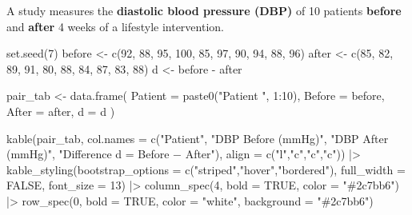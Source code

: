 \documentclass[
  12pt,
  letterpaper,
]{book}
\newenvironment{Shaded}{\begin{snugshade}}{\end{snugshade}}
\newcommand{\AttributeTok}[1]{\textcolor[rgb]{0.40,0.45,0.13}{#1}}
\newcommand{\ConstantTok}[1]{\textcolor[rgb]{0.56,0.35,0.01}{#1}}
\newcommand{\DecValTok}[1]{\textcolor[rgb]{0.68,0.00,0.00}{#1}}
\newcommand{\FunctionTok}[1]{\textcolor[rgb]{0.28,0.35,0.67}{#1}}
\newcommand{\NormalTok}[1]{\textcolor[rgb]{0.00,0.23,0.31}{#1}}
\newcommand{\OtherTok}[1]{\textcolor[rgb]{0.00,0.23,0.31}{#1}}
\newcommand{\SpecialCharTok}[1]{\textcolor[rgb]{0.37,0.37,0.37}{#1}}
\newcommand{\StringTok}[1]{\textcolor[rgb]{0.13,0.47,0.30}{#1}}
\begin{document}
A study measures the \textbf{diastolic blood pressure (DBP)} of 10
patients \textbf{before} and \textbf{after} 4 weeks of a lifestyle
intervention.

\begin{Shaded}
\begin{Highlighting}[]
\FunctionTok{set.seed}\NormalTok{(}\DecValTok{7}\NormalTok{)}
\NormalTok{before }\OtherTok{\textless{}{-}} \FunctionTok{c}\NormalTok{(}\DecValTok{92}\NormalTok{, }\DecValTok{88}\NormalTok{, }\DecValTok{95}\NormalTok{, }\DecValTok{100}\NormalTok{, }\DecValTok{85}\NormalTok{, }\DecValTok{97}\NormalTok{, }\DecValTok{90}\NormalTok{, }\DecValTok{94}\NormalTok{, }\DecValTok{88}\NormalTok{, }\DecValTok{96}\NormalTok{)}
\NormalTok{after  }\OtherTok{\textless{}{-}} \FunctionTok{c}\NormalTok{(}\DecValTok{85}\NormalTok{, }\DecValTok{82}\NormalTok{, }\DecValTok{89}\NormalTok{, }\DecValTok{91}\NormalTok{,  }\DecValTok{80}\NormalTok{, }\DecValTok{88}\NormalTok{, }\DecValTok{84}\NormalTok{, }\DecValTok{87}\NormalTok{, }\DecValTok{83}\NormalTok{, }\DecValTok{88}\NormalTok{)}
\NormalTok{d      }\OtherTok{\textless{}{-}}\NormalTok{ before }\SpecialCharTok{{-}}\NormalTok{ after}

\NormalTok{pair\_tab }\OtherTok{\textless{}{-}} \FunctionTok{data.frame}\NormalTok{(}
  \AttributeTok{Patient =} \FunctionTok{paste0}\NormalTok{(}\StringTok{"Patient "}\NormalTok{, }\DecValTok{1}\SpecialCharTok{:}\DecValTok{10}\NormalTok{),}
  \AttributeTok{Before  =}\NormalTok{ before,}
  \AttributeTok{After   =}\NormalTok{ after,}
  \AttributeTok{d       =}\NormalTok{ d}
\NormalTok{)}

\FunctionTok{kable}\NormalTok{(pair\_tab,}
      \AttributeTok{col.names =} \FunctionTok{c}\NormalTok{(}\StringTok{"Patient"}\NormalTok{, }\StringTok{"DBP Before (mmHg)"}\NormalTok{,}
                    \StringTok{"DBP After (mmHg)"}\NormalTok{, }\StringTok{"Difference d = Before − After"}\NormalTok{),}
      \AttributeTok{align =} \FunctionTok{c}\NormalTok{(}\StringTok{"l"}\NormalTok{,}\StringTok{"c"}\NormalTok{,}\StringTok{"c"}\NormalTok{,}\StringTok{"c"}\NormalTok{)) }\SpecialCharTok{|\textgreater{}}
  \FunctionTok{kable\_styling}\NormalTok{(}\AttributeTok{bootstrap\_options =} \FunctionTok{c}\NormalTok{(}\StringTok{"striped"}\NormalTok{,}\StringTok{"hover"}\NormalTok{,}\StringTok{"bordered"}\NormalTok{),}
                \AttributeTok{full\_width =} \ConstantTok{FALSE}\NormalTok{, }\AttributeTok{font\_size =} \DecValTok{13}\NormalTok{) }\SpecialCharTok{|\textgreater{}}
  \FunctionTok{column\_spec}\NormalTok{(}\DecValTok{4}\NormalTok{, }\AttributeTok{bold =} \ConstantTok{TRUE}\NormalTok{, }\AttributeTok{color =} \StringTok{"\#2c7bb6"}\NormalTok{) }\SpecialCharTok{|\textgreater{}}
  \FunctionTok{row\_spec}\NormalTok{(}\DecValTok{0}\NormalTok{, }\AttributeTok{bold =} \ConstantTok{TRUE}\NormalTok{, }\AttributeTok{color =} \StringTok{"white"}\NormalTok{, }\AttributeTok{background =} \StringTok{"\#2c7bb6"}\NormalTok{)}
\end{Highlighting}
\end{Shaded}
\end{document}
